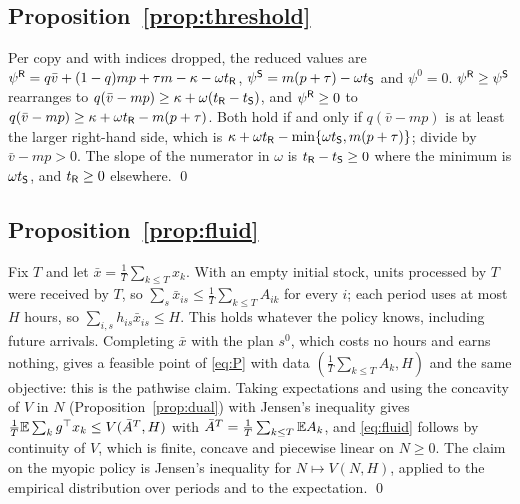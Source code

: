 \subsection*{Proposition~\ref{prop:threshold}}
Per copy and with indices dropped, the reduced values are
$\psi^{\mathsf{R}}=q\bar v+(1-q)mp+\tau m-\kappa-\omega t_{\mathsf{R}}$, $\psi^{\mathsf{S}}=m(p+\tau)-\omega t_{\mathsf{S}}$ and $\psi^0=0$.
$\psi^{\mathsf{R}}\ge\psi^{\mathsf{S}}$ rearranges to $q(\bar v-mp)\ge\kappa+\omega(t_{\mathsf{R}}-t_{\mathsf{S}})$, and $\psi^{\mathsf{R}}\ge0$ to
$q(\bar v-mp)\ge\kappa+\omega t_{\mathsf{R}}-m(p+\tau)$. Both hold if and only if $q(\bar v-mp)$ is at least the larger
right-hand side, which is $\kappa+\omega t_{\mathsf{R}}-\min\{\omega t_{\mathsf{S}},m(p+\tau)\}$; divide by $\bar v-mp>0$. The
slope of the numerator in $\omega$ is $t_{\mathsf{R}}-t_{\mathsf{S}}\ge0$ where the minimum is $\omega t_{\mathsf{S}}$, and
$t_{\mathsf{R}}\ge0$ elsewhere. \qed

\subsection*{Proposition~\ref{prop:fluid}}
Fix $T$ and let $\bar x=\frac1T\sum_{k\le T}x_k$. With an empty initial stock, units processed by $T$ were received
by $T$, so $\sum_s\bar x_{is}\le\frac1T\sum_{k\le T}A_{ik}$ for every $i$; each period uses at most $H$ hours, so
$\sum_{i,s}h_{is}\bar x_{is}\le H$. This holds whatever the policy knows, including future arrivals. Completing
$\bar x$ with the plan $s^0$, which costs no hours and earns nothing, gives a feasible point of \eqref{eq:P} with
data $(\frac1T\sum_{k\le T}A_k,H)$ and the same objective: this is the pathwise claim. Taking expectations and
using the concavity of $V$ in $N$ (Proposition~\ref{prop:dual}) with Jensen's inequality gives
$\frac1T\mathbb{E}\sum_kg^\top x_k\le V(\bar A^T,H)$ with $\bar A^T=\frac1T\sum_{k\le T}\mathbb{E} A_k$, and \eqref{eq:fluid}
follows by continuity of $V$, which is finite, concave and piecewise linear on $N\ge0$. The claim on the myopic
policy is Jensen's inequality for $N\mapsto V(N,H)$, applied to the empirical distribution over periods and to the
expectation. \qed

